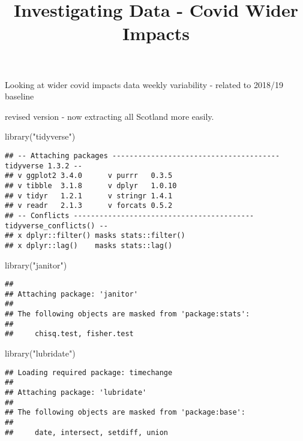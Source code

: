\documentclass[
]{article}
\title{Investigating Data - Covid Wider Impacts}
\author{}
\date{\vspace{-2.5em}}
\newenvironment{Shaded}{\begin{snugshade}}{\end{snugshade}}
\newcommand{\FunctionTok}[1]{\textcolor[rgb]{0.00,0.00,0.00}{#1}}
\newcommand{\NormalTok}[1]{#1}
\newcommand{\StringTok}[1]{\textcolor[rgb]{0.31,0.60,0.02}{#1}}
\begin{document}
\maketitle

Looking at wider covid impacts data weekly variability - related to
2018/19 baseline

revised version - now extracting all Scotland more easily.

\begin{Shaded}
\begin{Highlighting}[]
\FunctionTok{library}\NormalTok{(}\StringTok{"tidyverse"}\NormalTok{)}
\end{Highlighting}
\end{Shaded}

\begin{verbatim}
## -- Attaching packages --------------------------------------- tidyverse 1.3.2 --
## v ggplot2 3.4.0      v purrr   0.3.5 
## v tibble  3.1.8      v dplyr   1.0.10
## v tidyr   1.2.1      v stringr 1.4.1 
## v readr   2.1.3      v forcats 0.5.2 
## -- Conflicts ------------------------------------------ tidyverse_conflicts() --
## x dplyr::filter() masks stats::filter()
## x dplyr::lag()    masks stats::lag()
\end{verbatim}

\begin{Shaded}
\begin{Highlighting}[]
\FunctionTok{library}\NormalTok{(}\StringTok{"janitor"}\NormalTok{)}
\end{Highlighting}
\end{Shaded}

\begin{verbatim}
## 
## Attaching package: 'janitor'
## 
## The following objects are masked from 'package:stats':
## 
##     chisq.test, fisher.test
\end{verbatim}

\begin{Shaded}
\begin{Highlighting}[]
\FunctionTok{library}\NormalTok{(}\StringTok{"lubridate"}\NormalTok{)}
\end{Highlighting}
\end{Shaded}

\begin{verbatim}
## Loading required package: timechange
## 
## Attaching package: 'lubridate'
## 
## The following objects are masked from 'package:base':
## 
##     date, intersect, setdiff, union
\end{verbatim}
\end{document}
